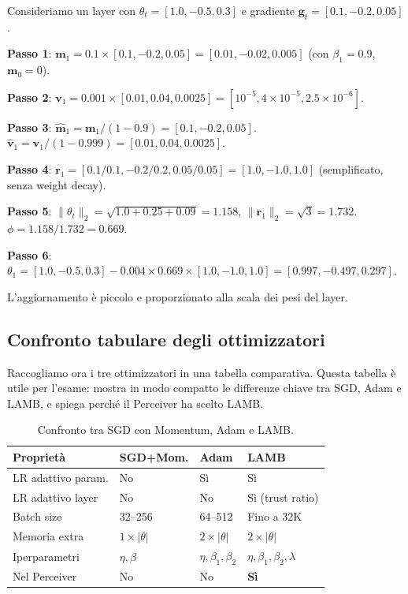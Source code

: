 \documentclass[12pt,a4paper]{article}
\begin{document}
\begin{examplebox}
Consideriamo un layer con $\theta_t = [1.0, -0.5, 0.3]$ e gradiente $\mathbf{g}_t = [0.1, -0.2, 0.05]$.

\textbf{Passo 1}: $\mathbf{m}_1 = 0.1 \times [0.1, -0.2, 0.05] = [0.01, -0.02, 0.005]$ (con $\beta_1 = 0.9$, $\mathbf{m}_0 = 0$).

\textbf{Passo 2}: $\mathbf{v}_1 = 0.001 \times [0.01, 0.04, 0.0025] = [10^{-5}, 4 \times 10^{-5}, 2.5 \times 10^{-6}]$.

\textbf{Passo 3}: $\hat{\mathbf{m}}_1 = \mathbf{m}_1 / (1 - 0.9) = [0.1, -0.2, 0.05]$.
$\hat{\mathbf{v}}_1 = \mathbf{v}_1 / (1 - 0.999) = [0.01, 0.04, 0.0025]$.

\textbf{Passo 4}: $\mathbf{r}_1 = [0.1/0.1, -0.2/0.2, 0.05/0.05] = [1.0, -1.0, 1.0]$ (semplificato, senza weight decay).

\textbf{Passo 5}: $\|\theta_t\|_2 = \sqrt{1.0 + 0.25 + 0.09} = 1.158$, $\|\mathbf{r}_1\|_2 = \sqrt{3} = 1.732$.
$\phi = 1.158 / 1.732 = 0.669$.

\textbf{Passo 6}: $\theta_1 = [1.0, -0.5, 0.3] - 0.004 \times 0.669 \times [1.0, -1.0, 1.0] = [0.997, -0.497, 0.297]$.

L'aggiornamento \`e piccolo e proporzionato alla scala dei pesi del layer.
\end{examplebox}

\subsection{Confronto tabulare degli ottimizzatori} \label{sec:confronto_ottimizzatori}

Raccogliamo ora i tre ottimizzatori in una tabella comparativa. Questa tabella \`e utile per l'esame: mostra in modo compatto le differenze chiave tra SGD, Adam e LAMB, e spiega perch\'e il Perceiver ha scelto LAMB.

\begin{table}[htbp]
\centering
\caption{Confronto tra SGD con Momentum, Adam e LAMB.}
\small
\begin{tabular}{@{}p{3cm}p{3cm}p{3cm}p{3.5cm}@{}}
\toprule
\textbf{Propriet\`a} & \textbf{SGD+Mom.} & \textbf{Adam} & \textbf{LAMB} \\
\midrule
LR adattivo param. & No & S\`i & S\`i \\
LR adattivo layer & No & No & S\`i (trust ratio) \\
Batch size & 32--256 & 64--512 & Fino a 32K \\
Memoria extra & $1\!\times\!|\theta|$ & $2\!\times\!|\theta|$ & $2\!\times\!|\theta|$ \\
Iperparametri & $\eta, \beta$ & $\eta, \beta_1, \beta_2$ & $\eta, \beta_1, \beta_2, \lambda$ \\
Nel Perceiver & No & No & \textbf{S\`i} \\
\bottomrule
\end{tabular}
\end{table}
\end{document}
